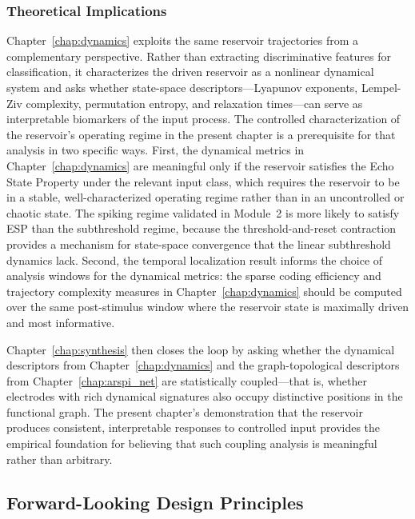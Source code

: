 \subsubsection{Theoretical Implications}

Chapter~\ref{chap:dynamics} exploits the same reservoir trajectories from a complementary perspective. Rather than extracting discriminative features for classification, it characterizes the driven reservoir as a nonlinear dynamical system and asks whether state-space descriptors---Lyapunov exponents, Lempel-Ziv complexity, permutation entropy, and relaxation times---can serve as interpretable biomarkers of the input process. The controlled characterization of the reservoir's operating regime in the present chapter is a prerequisite for that analysis in two specific ways. First, the dynamical metrics in Chapter~\ref{chap:dynamics} are meaningful only if the reservoir satisfies the Echo State Property under the relevant input class, which requires the reservoir to be in a stable, well-characterized operating regime rather than in an uncontrolled or chaotic state. The spiking regime validated in Module~2 is more likely to satisfy ESP than the subthreshold regime, because the threshold-and-reset contraction provides a mechanism for state-space convergence that the linear subthreshold dynamics lack. Second, the temporal localization result informs the choice of analysis windows for the dynamical metrics: the sparse coding efficiency and trajectory complexity measures in Chapter~\ref{chap:dynamics} should be computed over the same post-stimulus window where the reservoir state is maximally driven and most informative.

Chapter~\ref{chap:synthesis} then closes the loop by asking whether the dynamical descriptors from Chapter~\ref{chap:dynamics} and the graph-topological descriptors from Chapter~\ref{chap:arspi_net} are statistically coupled---that is, whether electrodes with rich dynamical signatures also occupy distinctive positions in the functional graph. The present chapter's demonstration that the reservoir produces consistent, interpretable responses to controlled input provides the empirical foundation for believing that such coupling analysis is meaningful rather than arbitrary.

\subsection{Forward-Looking Design Principles}

